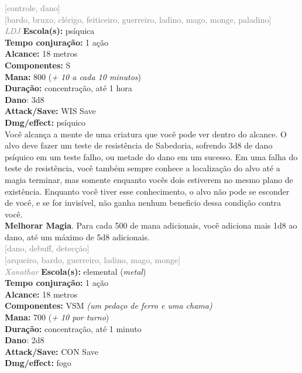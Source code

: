 \documentclass{RPG_Adventure}[2021/10/20]
\begin{document}
{\scriptsize \textcolor{gray}{[controle, dano]\\}}
{\scriptsize \textcolor{gray}{[bardo, bruxo, clérigo, feiticeiro, guerreiro, ladino, mago, monge, paladino]\\}}
{\tiny \textcolor{gray}{\textit{LDJ}}}\jump{}
{\small \t \textbf{Escola(s):} psíquica\\\t \textbf{Tempo conjuração:} 1 ação\\\t \textbf{Alcance:} 18 metros\\\t \textbf{Componentes:} S\\\t \textbf{Mana:} 800 (\textit{+ 10 a cada 10 minutos})\\\t \textbf{Duração:} concentração, até 1 hora\\\t \textbf{Dano}: 3d8\\\t \textbf{Attack/Save:} WIS Save\\\t \textbf{Dmg/effect:} psíquico\\}
{\normalsize Você alcança a mente de uma criatura que você pode ver dentro do alcance. O alvo deve fazer um teste de resistência de Sabedoria, sofrendo 3d8 de dano psíquico em um teste falho, ou metade do dano em um sucesso. Em uma falha do teste de resistência, você também sempre conhece a localização do alvo até a magia terminar, mas somente enquanto vocês dois estiverem no mesmo plano de existência. Enquanto você tiver esse conhecimento, o alvo não pode se esconder de você, e se for invisível, não ganha nenhum beneficio dessa condição contra você.\\\t \textbf{Melhorar Magia}. Para cada 500 de mana adicionais, você adiciona mais 1d8 ao dano, até um máximo de 5d8 adicionais.\\}
{\scriptsize \textcolor{gray}{[dano, debuff, detecção]\\}}
{\scriptsize \textcolor{gray}{[arqueiro, bardo, guerreiro, ladino, mago, monge]\\}}
{\tiny \textcolor{gray}{\textit{Xanathar}}}\jump{}
{\small \t \textbf{Escola(s):} elemental (\textit{metal})\\\t \textbf{Tempo conjuração:} 1 ação\\\t \textbf{Alcance:} 18 metros\\\t \textbf{Componentes:} VSM \textit{(um pedaço de ferro e uma chama)}\\\t \textbf{Mana:} 700 (\textit{+ 10 por turno})\\\t \textbf{Duração:} concentração, até 1 minuto\\\t \textbf{Dano}: 2d8\\\t \textbf{Attack/Save:} CON Save\\\t \textbf{Dmg/effect:} fogo\\}
\end{document}
